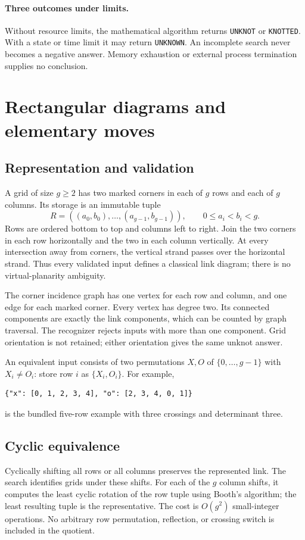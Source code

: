 \documentclass[11pt]{article}
\newcommand{\code}[1]{\texttt{#1}}
\begin{document}
\paragraph{Three outcomes under limits.}
Without resource limits, the mathematical algorithm returns \code{UNKNOT} or
\code{KNOTTED}. With a state or time limit it may return \code{UNKNOWN}.
An incomplete search never becomes a negative answer. Memory exhaustion or
external process termination supplies no conclusion.

\section{Rectangular diagrams and elementary moves}
\label{sec:encoding}
\subsection{Representation and validation}
A grid of size $g\geq2$ has two marked corners in each of $g$ rows and each of
$g$ columns. Its storage is an immutable tuple
\[
 R=((a_0,b_0),\ldots,(a_{g-1},b_{g-1})),\qquad 0\leq a_i<b_i<g.
\]
Rows are ordered bottom to top and columns left to right. Join the two corners
in each row horizontally and the two in each column vertically. At every
intersection away from corners, the vertical strand passes over the horizontal
strand. Thus every validated input defines a classical link diagram; there is
no virtual-planarity ambiguity.

The corner incidence graph has one vertex for each row and column, and one
edge for each marked corner. Every vertex has degree two. Its connected
components are exactly the link components, which can be counted by graph
traversal. The recognizer rejects inputs with more than one component. Grid
orientation is not retained; either orientation gives the same unknot answer.

An equivalent input consists of two permutations $X,O$ of
$\{0,\ldots,g-1\}$ with $X_i\ne O_i$: store row $i$ as
$\{X_i,O_i\}$. For example,
\begin{lstlisting}
{"x": [0, 1, 2, 3, 4], "o": [2, 3, 4, 0, 1]}
\end{lstlisting}
is the bundled five-row example with three crossings and determinant three.

\subsection{Cyclic equivalence}
Cyclically shifting all rows or all columns preserves the represented link.
The search identifies grids under these shifts. For each of the $g$ column
shifts, it computes the least cyclic rotation of the row tuple using Booth's
algorithm; the least resulting tuple is the representative. The cost is
$O(g^2)$ small-integer operations. No arbitrary row permutation, reflection, or
crossing switch is included in the quotient.
\end{document}
